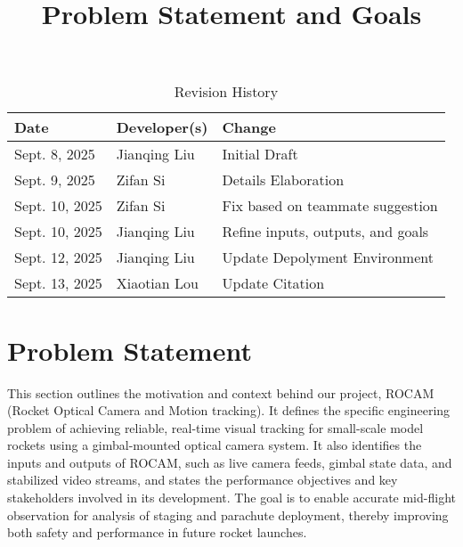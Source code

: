 \documentclass{article}
\title{Problem Statement and Goals\\\progname}
\author{\authname}
\date{}
\begin{document}
\maketitle

\begin{table}[hp]
  \caption{Revision History} \label{TblRevisionHistory}
  \begin{tabularx}{\textwidth}{llX}
    \toprule
    \textbf{Date}  & \textbf{Developer(s)} & \textbf{Change}                   \\
    \midrule
    Sept. 8, 2025  & Jianqing Liu          & Initial Draft                     \\
    Sept. 9, 2025  & Zifan Si              & Details Elaboration               \\
    Sept. 10, 2025 & Zifan Si              & Fix based on teammate suggestion  \\
    Sept. 10, 2025 & Jianqing Liu          & Refine inputs, outputs, and goals \\
    Sept. 12, 2025 & Jianqing Liu          & Update Depolyment Environment     \\
    Sept. 13, 2025 & Xiaotian Lou          & Update Citation                   \\
    \bottomrule
  \end{tabularx}
\end{table}

\newpage{}

\section{Problem Statement}
This section outlines the motivation and context behind our project, ROCAM
(Rocket Optical Camera and Motion tracking). It defines the specific
engineering problem of achieving reliable, real-time visual tracking for
small-scale model rockets using a gimbal-mounted optical camera system.
It also identifies the inputs and outputs of ROCAM, such as live camera
feeds, gimbal state data, and stabilized video streams, and states the
performance objectives and key stakeholders involved in its development.
The goal is to enable accurate mid-flight observation for analysis of
staging and parachute deployment, thereby improving both safety and
performance in future rocket launches.


\end{document}
